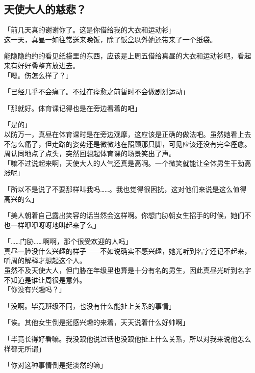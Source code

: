 \subsection{天使大人的慈悲？}

「前几天真的谢谢你了。这是你借给我的大衣和运动衫」\\

这一天，真昼一如往常送来晚饭，除了饭盒以外她还带来了一个纸袋。

能隐隐约约的看见纸袋里的东西，应该是上周五借给真昼的大衣和运动衫吧，看起来有好好叠整齐放进去。\\

「嗯。伤怎么样了？」

「已经几乎不会痛了。不过在痊愈之前暂时不会做剧烈运动」

「那就好。体育课记得也是在旁边看着的吧」

「是的」\\

以防万一，真昼在体育课时是在旁边观摩，这应该是正确的做法吧。虽然她看上去不怎么痛了，但走路的姿势还是微微地在照顾那只脚，可见应该还没有完全痊愈。\\

周认同地点了点头，突然回想起体育课的场景笑出了声。\\

「嘛不过说起来啊，天使大人的人气还真是高啊。一个微笑就能让全体男生干劲高涨呢」

「所以不是说了不要那样叫我吗……。我也觉得很困扰，这对他们来说是这么值得高兴的么」

「美人朝着自己露出笑容的话当然会这样啊。你想门胁朝女生招手的时候，她们不也一样咿咿呀呀地叫起来了么」

「……门胁……啊啊，那个很受欢迎的人吗」\\

真昼一脸没什么兴趣的样子——不如说确实不感兴趣，她光听到名字还记不起来，听周的解释才想起这个人。\\

虽然不及天使大人，但门胁在年级里也算是十分有名的男生，因此真昼光听到名字不知道是谁让周很是意外。\\

「你没有兴趣吗？」

「没啊。毕竟班级不同，也没有什么能扯上关系的事情」

「诶。其他女生倒是挺感兴趣的来着，天天说着什么好帅啊」

「毕竟长得好看嘛。我没跟他说过话也没跟他扯上什么关系，所以对我来说他怎么样都无所谓」

「你对这种事情倒是挺淡然的嘛」

